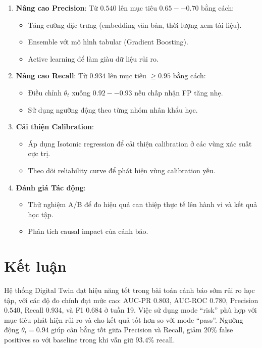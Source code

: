\documentclass[12pt,a4paper]{article}
\begin{document}
\begin{enumerate}
    \item \textbf{Nâng cao Precision}: Từ $0.540$ lên mục tiêu $0.65--0.70$ bằng cách:
    \begin{itemize}
        \item Tăng cường đặc trưng (embedding văn bản, thời lượng xem tài liệu).
        \item Ensemble với mô hình tabular (Gradient Boosting).
        \item Active learning để làm giàu dữ liệu rủi ro.
    \end{itemize}
    
    \item \textbf{Nâng cao Recall}: Từ $0.934$ lên mục tiêu $\geq 0.95$ bằng cách:
    \begin{itemize}
        \item Điều chỉnh $\theta_t$ xuống $0.92--0.93$ nếu chấp nhận FP tăng nhẹ.
        \item Sử dụng ngưỡng động theo từng nhóm nhân khẩu học.
    \end{itemize}
    
    \item \textbf{Cải thiện Calibration}:
    \begin{itemize}
        \item Áp dụng Isotonic regression để cải thiện calibration ở các vùng xác suất cực trị.
        \item Theo dõi reliability curve để phát hiện vùng calibration yếu.
    \end{itemize}
    
    \item \textbf{Đánh giá Tác động}:
    \begin{itemize}
        \item Thử nghiệm A/B để đo hiệu quả can thiệp thực tế lên hành vi và kết quả học tập.
        \item Phân tích causal impact của cảnh báo.
    \end{itemize}
\end{enumerate}

\section{Kết luận}

Hệ thống Digital Twin đạt hiệu năng tốt trong bài toán cảnh báo sớm rủi ro học tập, với các độ đo chính đạt mức cao: AUC-PR $0.803$, AUC-ROC $0.780$, Precision $0.540$, Recall $0.934$, và F1 $0.684$ ở tuần 19. Việc sử dụng mode ``risk'' phù hợp với mục tiêu phát hiện rủi ro và cho kết quả tốt hơn so với mode ``pass''. Ngưỡng động $\theta_t = 0.94$ giúp cân bằng tốt giữa Precision và Recall, giảm $20\%$ false positives so với baseline trong khi vẫn giữ $93.4\%$ recall.
\end{document}
